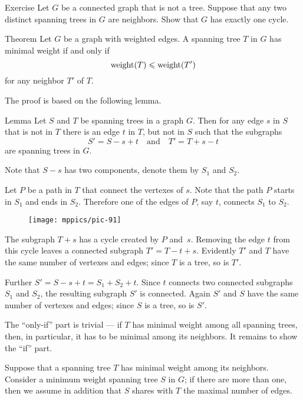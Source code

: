 \begin{thm}{Exercise}
Let $G$ be a connected graph that is not a tree.
Suppose that any two distinct spanning trees in $G$ are neighbors.
Show that $G$ has exactly one cycle.
\end{thm}

\begin{thm}{Theorem}\label{thm:mst-iff}
Let $G$ be a graph with weighted edges.
A spanning tree $T$ in $G$ has minimal weight if and only if
\[\mathop{\rm weight}\nolimits(T)\leqslant \mathop{\rm weight}\nolimits(T')\]
for any neighbor $T'$ of $T$.
\end{thm}

The proof is based on the following lemma.

\begin{thm}{Lemma}
Let $S$ and $T$ be spanning trees in a graph $G$.
Then for any edge $s$ in $S$ that is not in $T$ there is an edge $t$ in $T$, but not in $S$ such that the subgraphs
\[S'=S-s+t\quad\text{and}\quad T'=T+s-t\]
are spanning trees in $G$.
\end{thm}

Note that $S-s$ has two components, denote them by $S_1$ and $S_2$.

Let $P$ be a path in $T$ that connect the vertexes of $s$.
Note that the path $P$ starts in $S_1$ and ends in $S_2$.
Therefore one of the edges of $P$, say $t$, connects $S_1$ to $S_2$.

\begin{figure}[h!]
\vskip-0mm
\centering
\texttt{[image: mppics/pic-91]}
\end{figure}

The subgraph $T+s$ has a cycle created by $P$ and~$s$.
Removing the edge $t$ from this cycle leaves a connected subgraph $T'=T-t+s$.
Evidently $T'$ and $T$ have the same number of vertexes and edges;
since $T$ is a tree, so is $T'$.

Further $S'=S-s+t=S_1+S_2+t$.
Since $t$ connects two connected subgraphs $S_1$ and $S_2$, the resulting subgraph $S'$ is connected.
Again $S'$ and $S$ have the same number of vertexes and edges;
since $S$ is a tree, so is $S'$.
\qeds

 The ``only-if'' part is trivial --- if $T$ has minimal weight among all spanning trees, then, in particular, it has to be minimal among its neighbors. 
It remains to show the ``if'' part.

Suppose that a spanning tree $T$ has minimal weight among its neighbors.
Consider a minimum weight spanning tree $S$ in $G$;
if there are more than one, then
we assume in addition that $S$ shares with $T$ the maximal number of edges. 

